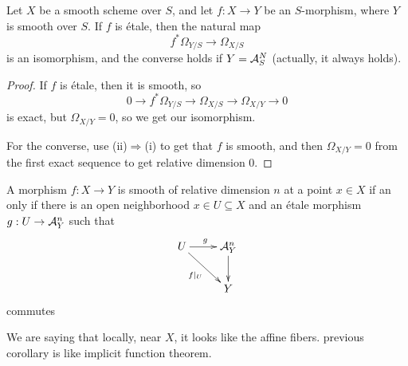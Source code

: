  \begin{corollary}\label{lec29cor}
 Let $X$ be a smooth scheme over $S$, and let $f:X\to Y$ be an
 $S$-morphism, where $Y$ is smooth over $S$.  If $f$ is \'etale,
 then the natural map
 \[
    f^*\Omega_{Y/S}\to \Omega_{X/S}
 \]
 is an isomorphism, and the converse holds if $Y=\mathcal{A}^N_S$ (actually, it
 always holds).
 \end{corollary}
 \begin{proof}
 If $f$ is \'etale, then it is smooth, so
 \[
 0\to f^*\Omega_{Y/S}\to \Omega_{X/S}\to \Omega_{X/Y}\to 0
 \]
 is exact, but $\Omega_{X/Y}=0$, so we get our isomorphism.

 For the converse, use (ii)$\Rightarrow$(i) to get that $f$ is
 smooth, and then $\Omega_{X/Y}=0$ from the first exact sequence
 to get relative dimension 0.
 \end{proof}

 \begin{theorem}\label{lec29etale}
 A morphism $f:X\to Y$ is smooth of relative dimension $n$ at a point
 $x\in X$ if an only if there is an open neighborhood $x\in
 U\subseteq X$ and an \'etale morphism $g:U\to \mathcal{A}^n_Y$ such that
 \[\xymatrix{
  U\ar[r]^g \ar[rd]_{f|_U} & \A^n_Y \ar[d]\\
  & Y
 }\]
 commutes
 \end{theorem}
 We are saying that locally, near $X$, it looks like the affine
 fibers.  previous corollary is like implicit function theorem.
